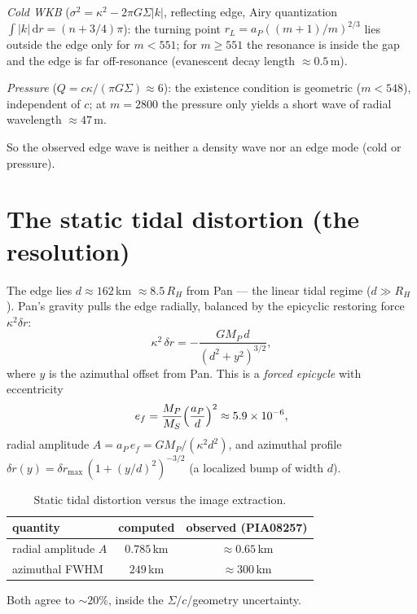 \documentclass[11pt]{article}
\theoremstyle{remark}
\newcommand{\dd}{\,\mathrm{d}}
\begin{document}
\emph{Cold WKB} ($\sigma^2=\kappa^2-2\pi G\Sigma|k|$, reflecting edge, Airy
quantization $\int|k|\dd r=(n+3/4)\pi$): the turning point
$r_L=a_P((m+1)/m)^{2/3}$ lies outside the edge only for $m<551$; for
$m\ge551$ the resonance is inside the gap and the edge is far off-resonance
(evanescent decay length $\approx0.5$\,m).

\emph{Pressure} ($Q=c\kappa/(\pi G\Sigma)\approx6$): the existence condition is
geometric ($m<548$), independent of $c$; at $m=2800$ the pressure only yields a
short wave of radial wavelength $\approx47$\,m.

So the observed edge wave is neither a density wave nor an edge mode (cold or
pressure).

\section{The static tidal distortion (the resolution)}\label{sec:tidal}

The edge lies $d\approx162$\,km $\approx8.5\,R_H$ from Pan --- the linear tidal
regime ($d\gg R_H$).  Pan's gravity pulls the edge radially, balanced by the
epicyclic restoring force $\kappa^2\delta r$:
\begin{equation}\label{eq:tidal}
\kappa^2\,\delta r=-\frac{GM_P\,d}{(d^2+y^2)^{3/2}},
\end{equation}
where $y$ is the azimuthal offset from Pan.  This is a \emph{forced epicycle}
with eccentricity
\begin{equation}\label{eq:ecc}
e_f=\frac{M_P}{M_S}\Bigl(\frac{a_P}{d}\Bigr)^2\approx5.9\times10^{-6},
\end{equation}
radial amplitude $A=a_P\,e_f=GM_P/(\kappa^2 d^2)$, and azimuthal profile
$\delta r(y)=\delta r_{\max}\,(1+(y/d)^2)^{-3/2}$ (a localized bump of width
$d$).

\begin{table}[ht]
\centering
\begin{tabular}{l c c}
\toprule
quantity & computed & observed (PIA08257)\\
\midrule
radial amplitude $A$ & $0.785$\,km & $\approx0.65$\,km\\
azimuthal FWHM & $249$\,km & $\approx300$\,km\\
\bottomrule
\end{tabular}
\caption{Static tidal distortion versus the image extraction.}
\label{tab:tidal}
\end{table}

Both agree to $\sim20\%$, inside the $\Sigma/c$/geometry uncertainty.
\end{document}
